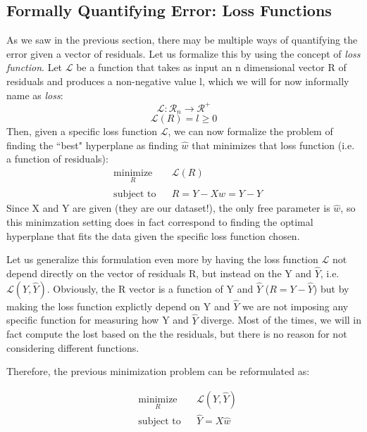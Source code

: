 \subsection{Formally Quantifying Error: Loss Functions}
As we saw in the previous section, there may be multiple ways of quantifying the error given a vector of residuals. Let us formalize this by using the concept of \emph{loss function}. Let $\mathcal{L}$ be a function that takes as input an n dimensional vector R of residuals and produces a non-negative value l, which we will for now informally name as \emph{loss}:
\begin{equation}
\mathcal{L} : \mathcal{R}_n \rightarrow \mathcal{R}^{+}
\end{equation}
\begin{equation}
\mathcal{L}(R) = l \ge 0
\end{equation}
Then, given a specific loss function $\mathcal{L}$, we can now formalize the problem of finding the ``best" hyperplane as finding $\hat{w}$ that minimizes that loss function (i.e. a function of residuals):
\begin{equation}
\begin{aligned}
& \underset{R}{\text{minimize}} & & \mathcal{L}(R) \\
& \text{subject to} & &  R = Y - X \hat{w} = Y - \hat{Y} 
\end{aligned}
\end{equation}
Since X and Y are given (they are our dataset!), the only free parameter is $\hat{w}$, so this minimzation setting does in fact correspond to finding the optimal hyperplane that fits the data given the specific loss function chosen. 

Let us generalize this formulation even more by having the loss function $\mathcal{L}$ not depend directly on the vector of residuals R, but instead on the Y and $\hat{Y}$, i.e. $\mathcal{L}(Y,\hat{Y})$. Obviously, the R vector is a function of Y and $\hat{Y}$ ($R = Y - \hat{Y}$) but by making the loss function explictly depend on Y and $\hat{Y}$ we are not imposing any specific function for measuring how Y and $\hat{Y}$ diverge. Most of the times, we will in fact compute the lost based on the the residuals, but there is no reason for not considering different functions.

Therefore, the previous minimization problem can be reformulated as:

\begin{equation}
\begin{aligned}
& \underset{R}{\text{minimize}} & & \mathcal{L}(Y, \hat{Y}) \\
& \text{subject to} & & \hat{Y} = X \hat{w}  
\label{eq.fundamental_minimization_problem}
\end{aligned}
\end{equation}

